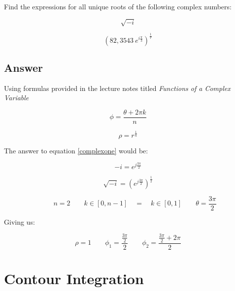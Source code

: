 \documentclass{article}
\begin{document}
Find the expressions for all unique roots of the following complex numbers:

\begin{equation} \label{complexone}
  \sqrt{-i}
\end{equation}

\begin{equation} \label{complex2}
  \left( 82,3543 \ e^{i \frac{\pi}{3}} \right)^{\frac{1}{7}}
\end{equation}

\subsection{Answer}

Using formulas provided in the lecture notes titled \textit{Functions of a 
Complex Variable} 

\begin{equation}
  \phi = \frac{\theta + 2 \pi k}{n}
\end{equation}

\begin{equation}
  \rho = r^{\frac{1}{n}}
\end{equation}

The answer to equation \ref{complexone} would be: 

\begin{equation}
  -i = e^{j\frac{3\pi}{2}}
\end{equation}

\begin{equation}
  \sqrt{-i} = \left( e^{j\frac{3\pi}{2}} \right)^{\frac{1}{2}}
\end{equation}

\begin{equation}
  \qquad n = 2
  \qquad k \in [0,n-1] \quad =
  \quad k \in [0,1]
  \qquad \theta = \frac{3 \pi}{2}
\end{equation}

Giving us:

\begin{equation}
  \rho = 1 \qquad
  \phi_1 = \frac{\frac{3 \pi}{2}}{2} \qquad
  \phi_2 = \frac{\frac{3 \pi}{2} + 2\pi}{2}
\end{equation}

\clearpage
\section{Contour Integration}
\end{document}
